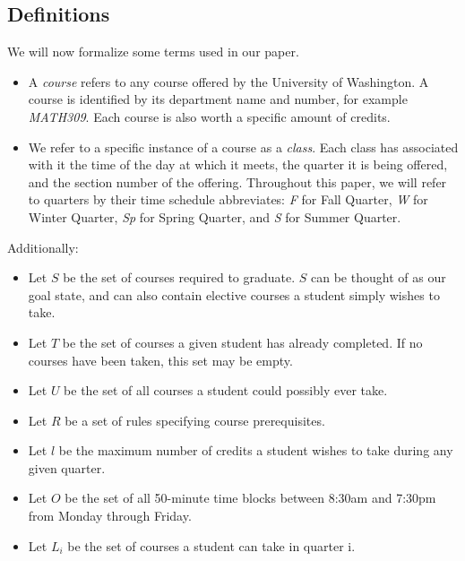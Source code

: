 \documentclass[11pt]{article} %
\begin{document}
\subsection{Definitions} We will now formalize some terms used in our paper.
\begin{itemize} \item A {\it course} refers to any course offered by the
University of Washington. A course is identified by its department name and
number, for example {\it MATH309}. Each course is also worth a specific amount
of credits. \item We refer to a specific instance of a course as a {\it class}.
Each class has associated with it the time of the day at which it meets, the
quarter it is being offered, and the section number of the offering.  Throughout
this paper, we will refer to quarters by their time schedule abbreviates: {\it
F} for Fall Quarter, {\it W} for Winter Quarter, {\it Sp} for Spring Quarter,
and {\it S} for Summer Quarter. \end{itemize}

Additionally: \begin{itemize} \item Let $S$ be the set of courses required to
graduate. $S$ can be thought of as our goal state, and can also contain elective
courses a student simply wishes to take.  \item Let $T$ be the set of courses
a given student has already completed. If no courses have been taken, this set
may be empty.  \item Let $U$ be the set of all courses a student could possibly
ever take.  \item Let $R$ be a set of rules specifying course prerequisites.
\item Let $l$ be the maximum number of credits a student wishes to take during
any given quarter.  \item Let $O$ be the set of all 50-minute time blocks
between 8:30am and 7:30pm from Monday through Friday. \item Let $L_i$ be the set
of courses a student can take in quarter i. \end{itemize}
\end{document}
